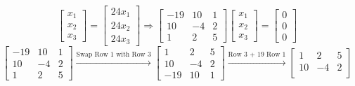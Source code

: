 \begin{enumerate}[label=(\alph*)]
\[                \begin{bmatrix}
                    x_1 \\
                    x_2 \\
                    x_3
                \end{bmatrix}
                =
                \begin{bmatrix}
                    24 x_1\\
                    24 x_2 \\
                    24 x_3
                \end{bmatrix}
                \Rightarrow
                \begin{bmatrix}
                    -19 & 10 & 1 \\
                    10 & -4 & 2 \\
                    1 & 2 & 5
                \end{bmatrix}
                \begin{bmatrix}
                    x_1 \\
                    x_2 \\
                    x_3
                \end{bmatrix}
                =
                \begin{bmatrix}
                    0 \\
                    0 \\
                    0
                \end{bmatrix}
            \]
            \[
                \begin{bmatrix}
                    -19 & 10 & 1 \\
                    10 & -4 & 2 \\
                    1 & 2 & 5
                \end{bmatrix}
                \overset{\text{Swap Row 1 with Row 3}}{\longrightarrow}
                \begin{bmatrix}
                    1 & 2 & 5 \\
                    10 & -4 & 2 \\
                    -19 & 10 & 1
                \end{bmatrix}
                \overset{\text{Row 3 + 19 Row 1}}{\longrightarrow}
                \begin{bmatrix}
                    1 & 2 & 5 \\
                    10 & -4 & 2 \\

\end{bmatrix}\]
\end{enumerate}
